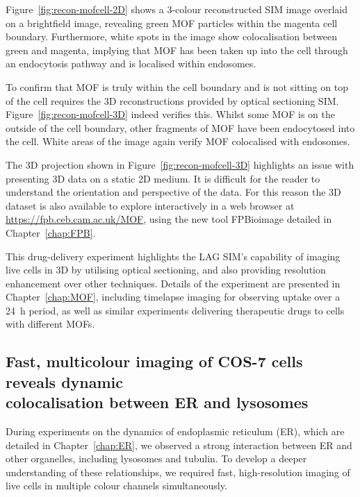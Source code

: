 Figure~\ref{fig:recon-mofcell-2D} shows a 3-colour reconstructed SIM image overlaid on a brightfield image, revealing green MOF particles within the magenta cell boundary.
Furthermore, white spots in the image show colocalisation between green and magenta, implying that MOF has been taken up into the cell through an endocytosis pathway and is localised within endosomes.

To confirm that MOF is truly within the cell boundary and is not sitting on top of the cell requires the 3D reconstructions provided by optical sectioning SIM.
Figure~\ref{fig:recon-mofcell-3D} indeed verifies this.
Whilst some MOF is on the outside of the cell boundary, other fragments of MOF have been endocytosed into the cell.
White areas of the image again verify MOF colocalised with endosomes.

The 3D projection shown in Figure~\ref{fig:recon-mofcell-3D} highlights an issue with presenting 3D data on a static 2D medium.
It is difficult for the reader to understand the orientation and perspective of the data.
For this reason the 3D dataset is also available to explore interactively in a web browser at \url{https://fpb.ceb.cam.ac.uk/MOF}, using the new tool FPBioimage detailed in Chapter~\ref{chap:FPB}.

This drug-delivery experiment highlights the LAG SIM's capability of imaging live cells in 3D by utilising optical sectioning, and also providing resolution enhancement over other techniques.
Details of the experiment are presented in Chapter~\ref{chap:MOF}, including timelapse imaging for observing uptake over a \SI{24}{\hour} period, as well as similar experiments delivering therapeutic drugs to cells with different MOFs.

\subsection[Fast, multicolour imaging of COS-7 cells reveals dynamic colocalisation between ER and lysosomes]{Fast, multicolour imaging of COS-7 cells reveals dynamic\\ colocalisation between ER and lysosomes}
During experiments on the dynamics of endoplasmic reticulum (ER), which are detailed in Chapter~\ref{chap:ER}, we observed a strong interaction between ER and other organelles, including lysosomes and tubulin.
To develop a deeper understanding of these relationships, we required fast, high-resolution imaging of live cells in multiple colour channels simultaneously.

